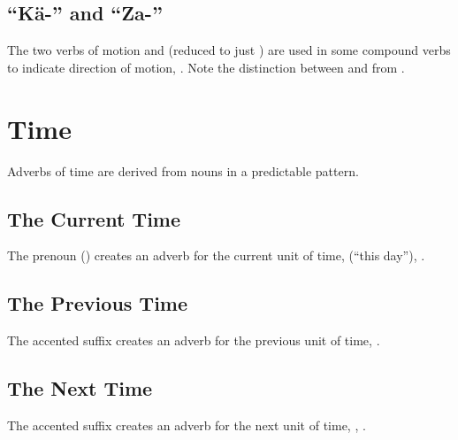 \subsection{``Kä-'' and ``Za-''} The two verbs of motion  
and   (reduced to just ) are used in some
compound verbs to indicate direction of motion, 
.  Note the distinction between  
and   from  .


\section{Time}
\noindent Adverbs of time are derived from nouns in a predictable
pattern.

\subsection{The Current Time} The prenoun 
() creates an adverb for the current unit
of time,   (``this day''),  . 

\subsection{The Previous Time} The accented suffix  creates an
adverb for the previous unit of time,  
 .

\subsection{The Next Time} The accented suffix  creates an
adverb for the next unit of time,  , 
 .
